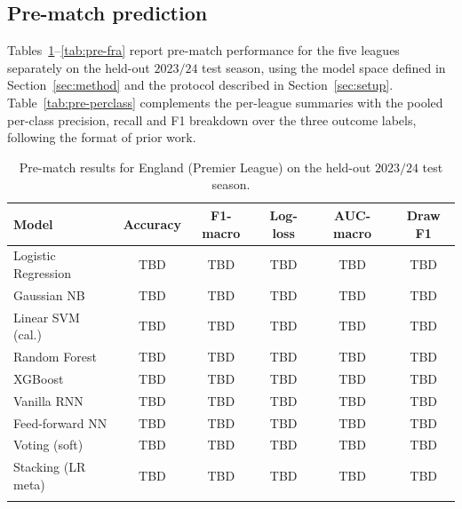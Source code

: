\documentclass[pdflatex,sn-mathphys-num]{sn-jnl}
\theoremstyle{thmstyleone}
\theoremstyle{thmstyletwo}
\theoremstyle{thmstylethree}
\begin{document}
\subsection{Pre-match prediction}\label{subsec:res-pre}

Tables~\ref{tab:pre-eng}--\ref{tab:pre-fra} report pre-match
performance for the five leagues separately on the held-out
$2023/24$ test season, using the model space defined in
Section~\ref{sec:method} and the protocol described in
Section~\ref{sec:setup}. Table~\ref{tab:pre-perclass} complements
the per-league summaries with the pooled per-class precision,
recall and F1 breakdown over the three outcome labels, following the
format of prior work.

\begin{table}[h]
\caption{Pre-match results for England (Premier League) on the held-out
$2023/24$ test season.}\label{tab:pre-eng}
\begin{tabular}{@{}lccccc@{}}
\toprule
Model               & Accuracy & F1-macro & Log-loss & AUC-macro & Draw F1 \\
\midrule
Logistic Regression & TBD & TBD & TBD & TBD & TBD \\
Gaussian NB         & TBD & TBD & TBD & TBD & TBD \\
Linear SVM (cal.)   & TBD & TBD & TBD & TBD & TBD \\
Random Forest       & TBD & TBD & TBD & TBD & TBD \\
XGBoost             & TBD & TBD & TBD & TBD & TBD \\
Vanilla RNN         & TBD & TBD & TBD & TBD & TBD \\
Feed-forward NN     & TBD & TBD & TBD & TBD & TBD \\
\midrule
Voting (soft)       & TBD & TBD & TBD & TBD & TBD \\
Stacking (LR meta)  & TBD & TBD & TBD & TBD & TBD \\
\botrule
\end{tabular}
\end{table}
\end{document}
